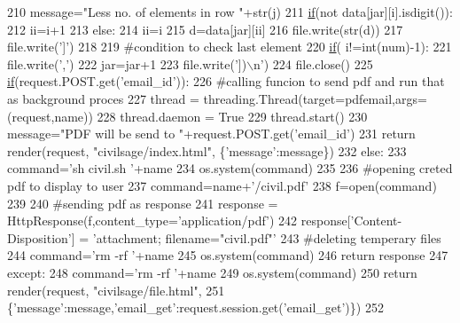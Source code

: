 \begin{DoxyCode}
210                 message=\textcolor{stringliteral}{"Less no. of elements in row "}+str(j)
211                 \hyperlink{bootstrap_8min_8js_ac2d69f5011896c6ed4a54e0dd36f6334}{if}(\textcolor{keywordflow}{not} data[jar][i].isdigit()):
212                     ii=i+1
213                 \textcolor{keywordflow}{else}:
214                     ii=i
215                 d=data[jar][ii]
216                 file.write(str(d))
217                 file.write(\textcolor{stringliteral}{']'})
218 
219                 \textcolor{comment}{#condition to check last element}
220                 \hyperlink{bootstrap_8min_8js_ac2d69f5011896c6ed4a54e0dd36f6334}{if}( i!=int(num)-1):
221                     file.write(\textcolor{stringliteral}{','})
222             jar=jar+1
223             file.write(\textcolor{stringliteral}{'])\(\backslash\)n'})
224         file.close()
225         \hyperlink{bootstrap_8min_8js_ac2d69f5011896c6ed4a54e0dd36f6334}{if}(request.POST.get(\textcolor{stringliteral}{'email\_id'})):
226             \textcolor{comment}{#calling funcion to send pdf and run that as background proces}
227             thread = threading.Thread(target=pdfemail,args=(request,name))
228             thread.daemon = \textcolor{keyword}{True}
229             thread.start()
230             message=\textcolor{stringliteral}{"PDF will be send to "}+request.POST.get(\textcolor{stringliteral}{'email\_id'})
231             \textcolor{keywordflow}{return} render(request, \textcolor{stringliteral}{"civilsage/index.html"}, \{\textcolor{stringliteral}{'message'}:message\})
232         \textcolor{keywordflow}{else}:
233             command=\textcolor{stringliteral}{'sh  civil.sh '}+name
234             os.system(command)
235 
236             \textcolor{comment}{#opening creted pdf to display to user}
237             command=name+\textcolor{stringliteral}{'/civil.pdf'}
238             f=open(command)
239 
240             \textcolor{comment}{#sending pdf as response}
241             response = HttpResponse(f,content\_type=\textcolor{stringliteral}{'application/pdf'})
242             response[\textcolor{stringliteral}{'Content-Disposition'}] = \textcolor{stringliteral}{'attachment; filename="civil.pdf"'}
243             \textcolor{comment}{#deleting temperary files}
244             command=\textcolor{stringliteral}{'rm -rf '}+name
245             os.system(command)
246             \textcolor{keywordflow}{return} response
247     \textcolor{keywordflow}{except}:
248         command=\textcolor{stringliteral}{'rm -rf '}+name
249         os.system(command)
250         \textcolor{keywordflow}{return} render(request, \textcolor{stringliteral}{"civilsage/file.html"},
251         \{\textcolor{stringliteral}{'message'}:message,\textcolor{stringliteral}{'email\_get'}:request.session.get(\textcolor{stringliteral}{'email\_get'})\})
252 
\end{DoxyCode}


